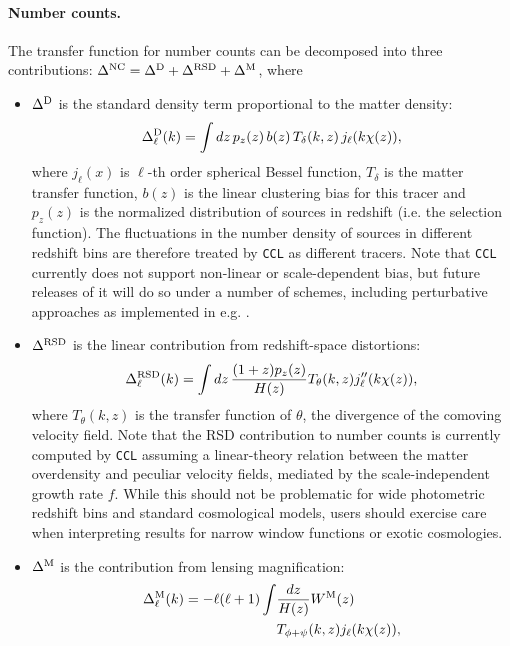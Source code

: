 \documentclass[\docopts]{\docclass}
\newcommand{\ccl}{{\tt CCL}\xspace}
\begin{document}
\paragraph{\bf Number counts.} The transfer function for number counts can be decomposed into three contributions: $\Delta^{\rm NC}=\Delta^{\rm D}+\Delta^{\rm RSD}+\Delta^{\rm M}$, where
\begin{itemize}
  \item $\Delta^{\rm D}$ is the standard density term proportional to the matter density:
        \begin{equation}
          \Delta^{\rm D}_\ell(k)=\int dz\,p_z(z)\,b(z)\,T_\delta(k,z)\,j_\ell(k\chi(z)),
        \end{equation}
        where $j_\ell(x)$ is $\ell$-th order spherical Bessel function, $T_\delta$ is the matter transfer function, $b(z)$ is the linear clustering bias for this tracer and $p_z(z)$ is the normalized distribution of sources in redshift (i.e. the selection function). The fluctuations in the number density of sources in different redshift bins are therefore treated by \ccl as different tracers. Note that \ccl currently does not support non-linear or scale-dependent bias, but future releases of it will do so under a number of schemes, including perturbative approaches as implemented in e.g. \cite{FASTPT}.
  \item $\Delta^{\rm RSD}$ is the linear contribution from redshift-space distortions:
        \begin{equation}
          \Delta^{\rm RSD}_\ell(k)=\int dz\,\frac{(1+z) p_z(z)}{H(z)}T_\theta(k,z) j_\ell''(k\chi(z)),
        \end{equation}
        where $T_\theta(k,z)$ is the transfer function of $\theta$, the divergence of the comoving velocity field. Note that the RSD contribution to number counts is currently computed by \ccl assuming a linear-theory relation between the matter overdensity and peculiar velocity fields, mediated by the scale-independent growth rate $f$. While this should not be problematic for wide photometric redshift bins and standard cosmological models, users should exercise care when interpreting results for narrow window functions or exotic cosmologies.
  \item $\Delta^{\rm M}$ is the contribution from lensing magnification:
        \begin{align}\nonumber
          \Delta_\ell^{\rm M}(k)=-\ell(\ell+1)\int & \frac{dz}{H(z)} W^{\rm M}(z) \\
          &T_{\phi+\psi}(k,z) j_\ell(k\chi(z)),

\end{align}
\end{itemize}
\end{document}
